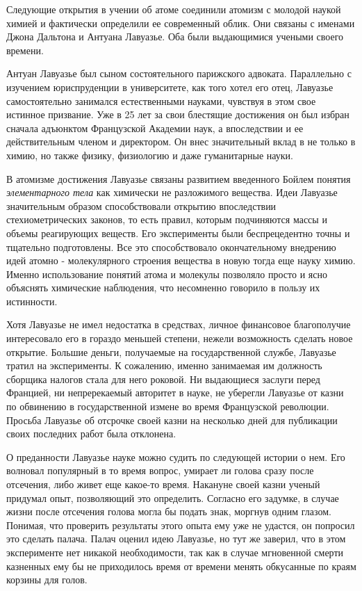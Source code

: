 Следующие открытия в учении об атоме соединили атомизм с молодой наукой химией и фактически определили ее современный облик.
Они связаны с именами Джона Дальтона и Антуана Лавуазье.
Оба были выдающимися учеными своего времени.

Антуан Лавуазье был сыном состоятельного парижского адвоката. 
Параллельно с изучением юриспруденции в университете, как того хотел его отец, Лавуазье самостоятельно занимался естественными науками, чувствуя в этом свое истинное призвание.
Уже в 25 лет за свои блестящие достижения он был избран сначала адъюнктом Французской Академии наук, а впоследствии и ее действительным членом и директором.
Он внес значительный вклад в не только в химию, но также физику, физиологию и даже гуманитарные науки.

В атомизме достижения Лавуазье связаны развитием введенного Бойлем понятия \textit{элементарного тела} как химически не разложимого вещества.
Идеи Лавуазье значительным образом способствовали открытию впоследствии стехиометрических законов, то есть правил, которым подчиняются массы и объемы реагирующих веществ.
Его эксперименты были беспрецедентно точны и тщательно подготовлены.
Все это способствовало окончательному внедрению идей атомно - молекулярного строения вещества в новую тогда еще науку химию.
Именно использование понятий атома и молекулы позволяло просто и ясно объяснять химические наблюдения, что несомненно говорило в пользу их истинности.

Хотя Лавуазье не имел недостатка в средствах, личное финансовое благополучие интересовало его в гораздо меньшей степени, нежели возможность сделать новое открытие. 
Большие деньги, получаемые на государственной службе, Лавуазье тратил на эксперименты.
К сожалению, именно занимаемая им должность сборщика налогов стала для него роковой.
Ни выдающиеся заслуги перед Францией, ни непререкаемый авторитет в науке, не уберегли Лавуазье от казни по обвинению в государственной измене во время Французской революции.
Просьба Лавуазье об отсрочке своей казни на несколько дней для публикации своих последних работ была отклонена.

О преданности Лавуазье науке можно судить по следующей истории о нем.
Его волновал популярный в то время вопрос, умирает ли голова сразу после отсечения, либо живет еще какое-то время.
Накануне своей казни ученый придумал опыт, позволяющий это определить.
Согласно его задумке, в случае жизни после отсечения голова могла бы подать знак, моргнув одним глазом.  
Понимая, что проверить результаты этого опыта ему уже не удастся, он попросил это сделать палача. 
Палач оценил идею Лавуазье, но тут же заверил, что в этом эксперименте нет никакой необходимости, так как в случае мгновенной смерти казненных ему бы не приходилось время от времени менять обкусанные по краям корзины для голов.

